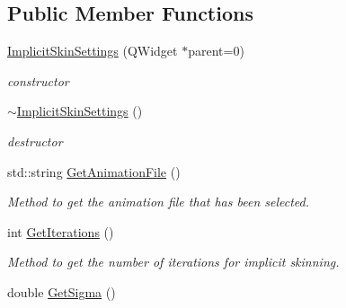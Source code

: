 \subsection*{Public Member Functions}
\begin{DoxyCompactItemize}
\item 
\hyperlink{classImplicitSkinSettings_af22531962948dfdad26d517d51a4c185}{Implicit\+Skin\+Settings} (Q\+Widget $\ast$parent=0)\hypertarget{classImplicitSkinSettings_af22531962948dfdad26d517d51a4c185}{}\label{classImplicitSkinSettings_af22531962948dfdad26d517d51a4c185}

\begin{DoxyCompactList}\small\item\em constructor \end{DoxyCompactList}\item 
\hyperlink{classImplicitSkinSettings_a905d9f0aa6a643620a103f22a6531a8b}{$\sim$\+Implicit\+Skin\+Settings} ()\hypertarget{classImplicitSkinSettings_a905d9f0aa6a643620a103f22a6531a8b}{}\label{classImplicitSkinSettings_a905d9f0aa6a643620a103f22a6531a8b}

\begin{DoxyCompactList}\small\item\em destructor \end{DoxyCompactList}\item 
std\+::string \hyperlink{classImplicitSkinSettings_aef60d6c0a02d006dcd3828219c080fa9}{Get\+Animation\+File} ()\hypertarget{classImplicitSkinSettings_aef60d6c0a02d006dcd3828219c080fa9}{}\label{classImplicitSkinSettings_aef60d6c0a02d006dcd3828219c080fa9}

\begin{DoxyCompactList}\small\item\em Method to get the animation file that has been selected. \end{DoxyCompactList}\item 
int \hyperlink{classImplicitSkinSettings_a10db3d39aab7ad1e39a296ef8ad4be2b}{Get\+Iterations} ()\hypertarget{classImplicitSkinSettings_a10db3d39aab7ad1e39a296ef8ad4be2b}{}\label{classImplicitSkinSettings_a10db3d39aab7ad1e39a296ef8ad4be2b}

\begin{DoxyCompactList}\small\item\em Method to get the number of iterations for implicit skinning. \end{DoxyCompactList}\item 
double \hyperlink{classImplicitSkinSettings_a14bff3b55c1ea2e97c96652c678e180f}{Get\+Sigma} ()\hypertarget{classImplicitSkinSettings_a14bff3b55c1ea2e97c96652c678e180f}{}\label{classImplicitSkinSettings_a14bff3b55c1ea2e97c96652c678e180f}


\end{DoxyCompactItemize}
